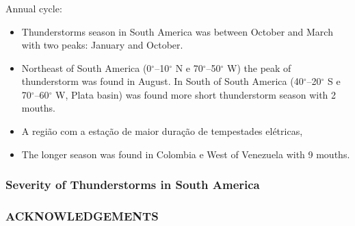 \documentclass[smaller]{beamer}
\begin{document}
\begin{frame}
\frametitle{}
\Large{Annual cycle:}
\begin{itemize}
\item Thunderstorms season in South America was between October and March with two peaks: January and October.
\item Northeast of South America (0$^{\circ}$--10$^{\circ}$ N e 70$^{\circ}$--50$^{\circ}$ W) the peak of thunderstorm was found in August. In South of South America (40$^{\circ}$--20$^{\circ}$ S e 70$^{\circ}$--60$^{\circ}$ W, Plata basin) was found more short thunderstorm season with 2 mouths.  
\item A região com a estação de maior duração de tempestades elétricas,
\item The longer season was found in Colombia e West of Venezuela with 9 mouths.
\end{itemize}

\end{frame}







\begin{frame}
\frametitle{Severity of Thunderstorms in South America}

\end{frame}


\begin{frame}
\frametitle{ACKNOWLEDGEMENTS}



\end{frame}
\end{document}
